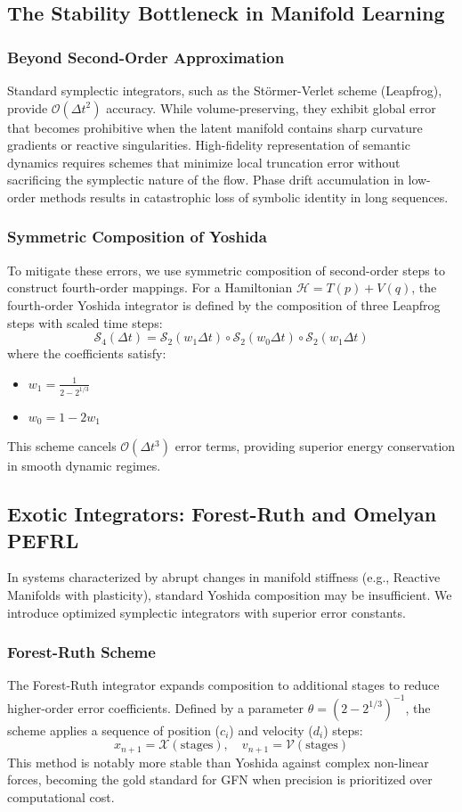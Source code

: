 \documentclass{article}
\numberwithin{equation}{section}
\begin{document}
\subsection{The Stability Bottleneck in Manifold Learning}
\subsubsection{Beyond Second-Order Approximation}
Standard symplectic integrators, such as the Störmer-Verlet scheme (Leapfrog), provide $\mathcal{O}(\Delta t^2)$ accuracy. While volume-preserving, they exhibit global error that becomes prohibitive when the latent manifold contains sharp curvature gradients or reactive singularities. High-fidelity representation of semantic dynamics requires schemes that minimize local truncation error without sacrificing the symplectic nature of the flow. Phase drift accumulation in low-order methods results in catastrophic loss of symbolic identity in long sequences.

\subsubsection{Symmetric Composition of Yoshida}
To mitigate these errors, we use symmetric composition of second-order steps to construct fourth-order mappings. For a Hamiltonian $\mathcal{H} = T(p) + V(q)$, the fourth-order Yoshida integrator is defined by the composition of three Leapfrog steps with scaled time steps:
\[
\mathcal{S}_4(\Delta t) = \mathcal{S}_2(w_1 \Delta t) \circ \mathcal{S}_2(w_0 \Delta t) \circ \mathcal{S}_2(w_1 \Delta t)
\]
where the coefficients satisfy:
\begin{itemize}
\item $w_1 = \frac{1}{2 - 2^{1/3}}$
\item $w_0 = 1 - 2w_1$
\end{itemize}
This scheme cancels $\mathcal{O}(\Delta t^3)$ error terms, providing superior energy conservation in smooth dynamic regimes.

\subsection{Exotic Integrators: Forest-Ruth and Omelyan PEFRL}
In systems characterized by abrupt changes in manifold stiffness (e.g., Reactive Manifolds with plasticity), standard Yoshida composition may be insufficient. We introduce optimized symplectic integrators with superior error constants.

\subsubsection{Forest-Ruth Scheme}
The Forest-Ruth integrator expands composition to additional stages to reduce higher-order error coefficients. Defined by a parameter $\theta = (2 - 2^{1/3})^{-1}$, the scheme applies a sequence of position ($c_i$) and velocity ($d_i$) steps:
\[
x_{n+1} = \mathcal{X}(\text{stages}), \quad v_{n+1} = \mathcal{V}(\text{stages})
\]
This method is notably more stable than Yoshida against complex non-linear forces, becoming the gold standard for GFN when precision is prioritized over computational cost.
\end{document}
